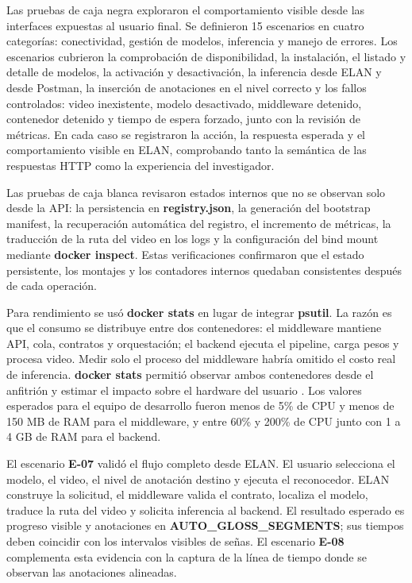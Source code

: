 \documentclass[11pt,a4paper]{article}
\begin{document}
Las pruebas de caja negra exploraron el comportamiento visible desde las interfaces expuestas al usuario final. Se definieron 15 escenarios en cuatro categorías: conectividad, gestión de modelos, inferencia y manejo de errores. Los escenarios cubrieron la comprobación de disponibilidad, la instalación, el listado y detalle de modelos, la activación y desactivación, la inferencia desde ELAN y desde Postman, la inserción de anotaciones en el nivel correcto y los fallos controlados: video inexistente, modelo desactivado, middleware detenido, contenedor detenido y tiempo de espera forzado, junto con la revisión de métricas. En cada caso se registraron la acción, la respuesta esperada y el comportamiento visible en ELAN, comprobando tanto la semántica de las respuestas HTTP como la experiencia del investigador.

Las pruebas de caja blanca revisaron estados internos que no se observan solo desde la API: la persistencia en \textbf{registry.json}, la generación del bootstrap manifest, la recuperación automática del registro, el incremento de métricas, la traducción de la ruta del video en los logs y la configuración del bind mount mediante \textbf{docker inspect}. Estas verificaciones confirmaron que el estado persistente, los montajes y los contadores internos quedaban consistentes después de cada operación.

Para rendimiento se usó \textbf{docker stats} en lugar de integrar \textbf{psutil}. La razón es que el consumo se distribuye entre dos contenedores: el middleware mantiene API, cola, contratos y orquestación; el backend ejecuta el pipeline, carga pesos y procesa video. Medir solo el proceso del middleware habría omitido el costo real de inferencia. \textbf{docker stats} permitió observar ambos contenedores desde el anfitrión y estimar el impacto sobre el hardware del usuario \cite{docker_cli_stats}. Los valores esperados para el equipo de desarrollo fueron menos de 5\% de CPU y menos de 150 MB de RAM para el middleware, y entre 60\% y 200\% de CPU junto con 1 a 4 GB de RAM para el backend.

El escenario \textbf{E-07} validó el flujo completo desde ELAN. El usuario selecciona el modelo, el video, el nivel de anotación destino y ejecuta el reconocedor. ELAN construye la solicitud, el middleware valida el contrato, localiza el modelo, traduce la ruta del video y solicita inferencia al backend. El resultado esperado es progreso visible y anotaciones en \textbf{AUTO\_GLOSS\_SEGMENTS}; sus tiempos deben coincidir con los intervalos visibles de señas. El escenario \textbf{E-08} complementa esta evidencia con la captura de la línea de tiempo donde se observan las anotaciones alineadas.
\end{document}
